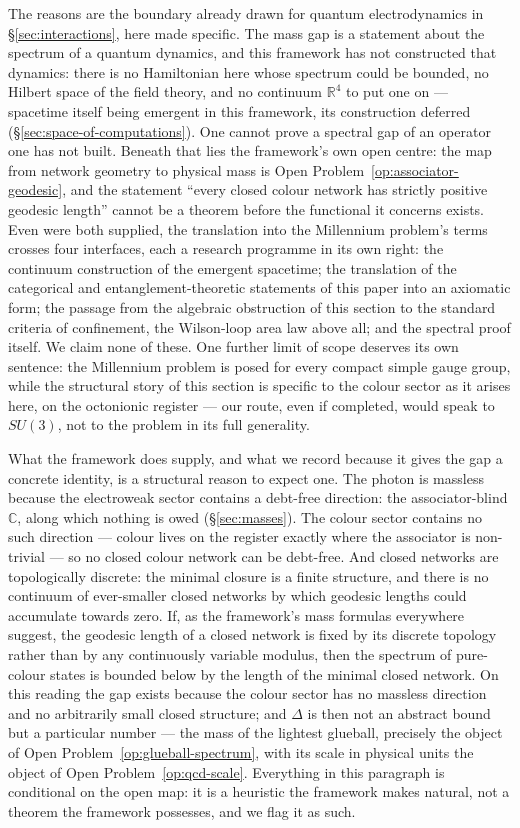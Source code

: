 The reasons are the boundary already drawn for quantum electrodynamics in \S\ref{sec:interactions},
here made specific. The mass gap is a statement about the spectrum of a quantum dynamics, and this
framework has not constructed that dynamics: there is no Hamiltonian here whose spectrum could be
bounded, no Hilbert space of the field theory, and no continuum $\mathbb{R}^{4}$ to put one on ---
spacetime itself being emergent in this framework, its construction deferred
(\S\ref{sec:space-of-computations}). One cannot prove a spectral gap of an operator one has not
built. Beneath that lies the framework's own open centre: the map from network geometry to physical
mass is Open Problem~\ref{op:associator-geodesic}, and the statement ``every closed colour network
has strictly positive geodesic length'' cannot be a theorem before the functional it concerns
exists. Even were both supplied, the translation into the Millennium problem's terms crosses four
interfaces, each a research programme in its own right: the continuum construction of the emergent
spacetime; the translation of the categorical and entanglement-theoretic statements of this paper
into an axiomatic form; the passage from the algebraic obstruction of this section to the standard
criteria of confinement, the Wilson-loop area law above all; and the spectral proof itself. We claim
none of these. One further limit of scope deserves its own sentence: the Millennium problem is posed
for every compact simple gauge group, while the structural story of this section is specific to the
colour sector as it arises here, on the octonionic register --- our route, even if completed, would
speak to $SU(3)$, not to the problem in its full generality.

What the framework does supply, and what we record because it gives the gap a concrete identity, is
a structural reason to expect one. The photon is massless because the electroweak sector contains a
debt-free direction: the associator-blind $\mathbb{C}$, along which nothing is owed
(\S\ref{sec:masses}). The colour sector contains no such direction --- colour lives on the register
exactly where the associator is non-trivial --- so no closed colour network can be debt-free. And
closed networks are topologically discrete: the minimal closure is a finite structure, and there is
no continuum of ever-smaller closed networks by which geodesic lengths could accumulate towards
zero. If, as the framework's mass formulas everywhere suggest, the geodesic length of a closed
network is fixed by its discrete topology rather than by any continuously variable modulus, then the
spectrum of pure-colour states is bounded below by the length of the minimal closed network. On this
reading the gap exists because the colour sector has no massless direction and no arbitrarily small
closed structure; and $\Delta$ is then not an abstract bound but a particular number --- the mass of
the lightest glueball, precisely the object of Open Problem~\ref{op:glueball-spectrum}, with its
scale in physical units the object of Open Problem~\ref{op:qcd-scale}. Everything in this paragraph
is conditional on the open map: it is a heuristic the framework makes natural, not a theorem the
framework possesses, and we flag it as such.


